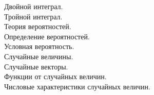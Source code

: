 \documentclass[a4paper]{article}
\begin{document}
Двойной интеграл. \\


Тройной интеграл. \\


Теория вероятностей. \\
Определение вероятностей. \\


Условная вероятность. \\


Случайные величины. \\


\newpage
Случайные векторы. \\


\newpage
Функции от случайных величин.\\


\newpage
Числовые характеристики случайных величин.\\

\end{document}
